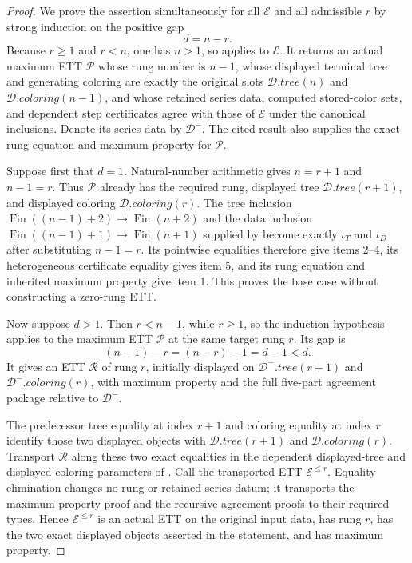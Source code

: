 \begin{proof}
We prove the assertion simultaneously for all $\mathcal E$ and all
admissible $r$ by strong induction on the positive gap
\[
                              d=n-r.
\]
Because $r\geq1$ and $r<n$, one has $n>1$, so
 applies to $\mathcal E$.  It returns an
actual maximum ETT $\mathcal P$ whose rung number is $n-1$, whose
displayed terminal tree and generating coloring are exactly the original
slots $\mathcal D.\mathit{tree}(n)$ and
$\mathcal D.\mathit{coloring}(n-1)$, and whose retained series data,
computed stored-color sets, and dependent step certificates agree with
those of $\mathcal E$ under the canonical inclusions.  Denote its series
data by $\mathcal D^-$.  The cited result also supplies the exact rung
equation and maximum property for $\mathcal P$.

Suppose first that $d=1$.  Natural-number arithmetic gives $n=r+1$ and
$n-1=r$.  Thus $\mathcal P$ already has the required rung, displayed
tree $\mathcal D.\mathit{tree}(r+1)$, and displayed coloring
$\mathcal D.\mathit{coloring}(r)$.  The tree inclusion
$\operatorname{Fin}((n-1)+2)\to\operatorname{Fin}(n+2)$ and the data
inclusion
$\operatorname{Fin}((n-1)+1)\to\operatorname{Fin}(n+1)$ supplied by
 become exactly $\iota_T$ and
$\iota_D$ after substituting $n-1=r$.  Its pointwise equalities therefore
give items 2--4, its heterogeneous certificate equality gives item 5,
and its rung equation and inherited maximum property give item 1.  This
proves the base case without constructing a zero-rung ETT.

Now suppose $d>1$.  Then $r<n-1$, while $r\geq1$, so the induction
hypothesis applies to the maximum ETT $\mathcal P$ at the same target
rung $r$.  Its gap is
\[
                    (n-1)-r=(n-r)-1=d-1<d.
\]
It gives an ETT $\mathcal R$ of rung $r$, initially displayed on
$\mathcal D^-.\mathit{tree}(r+1)$ and
$\mathcal D^-.\mathit{coloring}(r)$, with maximum property and the full
five-part agreement package relative to $\mathcal D^-$.

The predecessor tree equality at index $r+1$ and coloring equality at
index $r$ identify those two displayed objects with
$\mathcal D.\mathit{tree}(r+1)$ and
$\mathcal D.\mathit{coloring}(r)$.  Transport $\mathcal R$ along these
two exact equalities in the dependent displayed-tree and
displayed-coloring parameters of
.  Call the transported ETT
$\mathcal E^{\leq r}$.  Equality elimination changes no rung or retained
series datum; it transports the maximum-property proof and the recursive
agreement proofs to their required types.  Hence
$\mathcal E^{\leq r}$ is an actual ETT on the original input data, has
rung $r$, has the two exact displayed objects asserted in the statement,
and has maximum property.


\end{proof}
